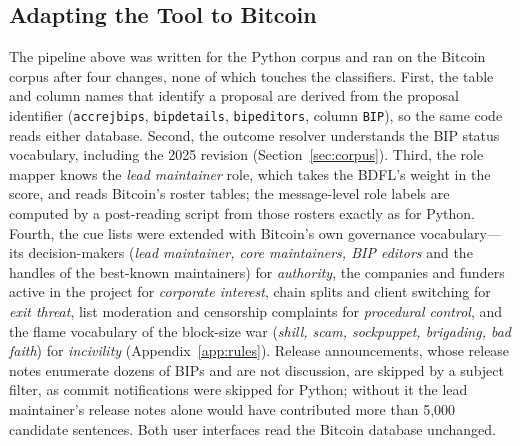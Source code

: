 \subsection{Adapting the Tool to Bitcoin}
\label{sec:adaptation}

The pipeline above was written for the Python corpus and ran on the Bitcoin corpus after four changes, none of which touches the classifiers. First, the table and column names that identify a proposal are derived from the proposal identifier (\texttt{accrejbips}, \texttt{bipdetails}, \texttt{bipeditors}, column \texttt{BIP}), so the same code reads either database. Second, the outcome resolver understands the BIP status vocabulary, including the 2025 revision (Section~\ref{sec:corpus}). Third, the role mapper knows the \emph{lead maintainer} role, which takes the BDFL's weight in the score, and reads Bitcoin's roster tables; the message-level role labels are computed by a post-reading script from those rosters exactly as for Python. Fourth, the cue lists were extended with Bitcoin's own governance vocabulary---its decision-makers (\emph{lead maintainer, core maintainers, BIP editors} and the handles of the best-known maintainers) for \emph{authority}, the companies and funders active in the project for \emph{corporate interest}, chain splits and client switching for \emph{exit threat}, list moderation and censorship complaints for \emph{procedural control}, and the flame vocabulary of the block-size war (\emph{shill, scam, sockpuppet, brigading, bad faith}) for \emph{incivility} (Appendix~\ref{app:rules}). Release announcements, whose release notes enumerate dozens of BIPs and are not discussion, are skipped by a subject filter, as commit notifications were skipped for Python; without it the lead maintainer's release notes alone would have contributed more than 5,000 candidate sentences. Both user interfaces read the Bitcoin database unchanged.

